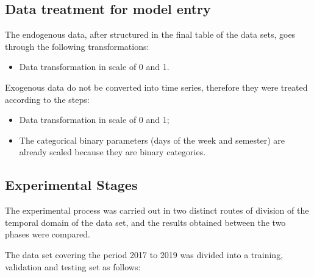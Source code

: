         \subsection{Data treatment for model entry}
         	The endogenous data, after structured in the final table of the data sets, goes through the following transformations:
         	\begin{itemize}
                \itemCalculation of the standard deviation of each vector of attributes, and normalization of the maximum values for the ceiling of 3x the standard deviation and minimum of 0; 
                \item	Data transformation in scale of 0 and 1.
            \end{itemize}
            Exogenous data do not be converted into time series, therefore they were treated according to the steps:
            \begin{itemize}
                \item	Data transformation in scale of 0 and 1;
                \item	The categorical binary parameters (days of the week and semester) are already scaled because they are binary categories.
            \end{itemize}
    	\subsection{Experimental Stages} \label{subsec:fases_experimentais}
            The experimental process was carried out in two distinct routes of division of the temporal domain of the data set, and the results obtained between the two phases were compared.
            
            The data set covering the period 2017 to 2019 was divided into a training, validation and testing set as follows: 
            
